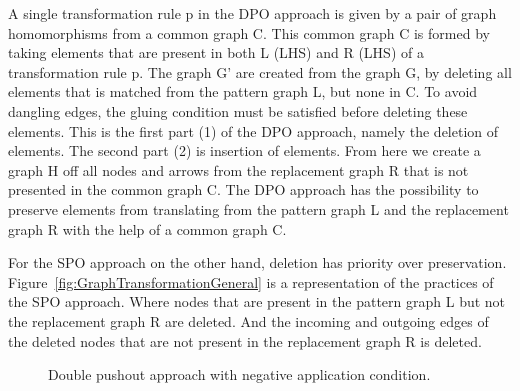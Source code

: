 A single transformation rule p in the DPO approach is given by a pair of graph
homomorphisms from a common graph C. This common graph C is formed by taking
elements that are present in both L (LHS) and R (LHS) of a transformation rule
p. The graph G' are created from the graph G, by deleting all elements that is
matched from the pattern graph L, but none in C. To avoid dangling edges,
the gluing condition must be satisfied before deleting these elements. This is
the first part (1) of the DPO approach, namely the deletion of elements. The
second part (2) is insertion of elements. From here we create a graph H off all
nodes and arrows from the replacement graph R that is not presented in the
common graph C. The DPO approach has the possibility to preserve elements from
translating from the pattern graph L and the replacement graph R with the help
of a common graph C.

For the SPO approach on the other hand, deletion has priority over preservation.
Figure~\ref{fig:GraphTransformationGeneral} is a representation of the practices
of the SPO approach. Where nodes that are present in the pattern graph L but not
the replacement graph R are deleted. And the incoming and outgoing edges of the
deleted nodes that are not present in the replacement graph R is deleted.

\cite{habel1996graph}

\begin{figure}[H]
	\centering
	\caption[The Double Pushout approach with NAC]
	{Double pushout approach with negative application condition.}
	\label{fig:DPO_NAC}
\end{figure}

